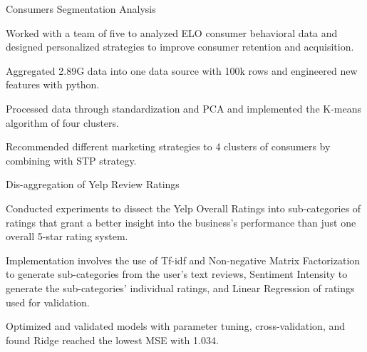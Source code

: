 
\begin{cventries}
  \cventry
    {} %
    {Consumers Segmentation Analysis} %
    {} %
    {} %
    {
      \begin{cvitems} %
        \item {Worked with a team of five to analyzed ELO consumer behavioral data and designed personalized strategies to improve consumer retention and acquisition.}
		\item {Aggregated 2.89G data into one data source with 100k rows and engineered new features with python.}
		\item {Processed data through standardization and PCA and implemented the K-means algorithm of four clusters.}
		\item {Recommended different marketing strategies to 4 clusters of consumers by combining with STP strategy.}
      \end{cvitems}
    }

  \cventry
    {} %
    {Dis-aggregation of Yelp Review Ratings} %
    {} %
    {} %
    {
      \begin{cvitems} %
      	\item {Conducted experiments to dissect the Yelp Overall Ratings into sub-categories of ratings that grant a better insight into the business’s performance than just one overall 5-star rating system.}
		\item {Implementation involves the use of Tf-idf and Non-negative Matrix Factorization to generate sub-categories from the user’s text reviews, Sentiment Intensity to generate the sub-categories’ individual ratings, and Linear Regression of ratings used for validation.}
		\item {Optimized and validated models with parameter tuning, cross-validation, and found Ridge reached the lowest MSE with 1.034.}
      \end{cvitems}
    }
\end{cventries}
